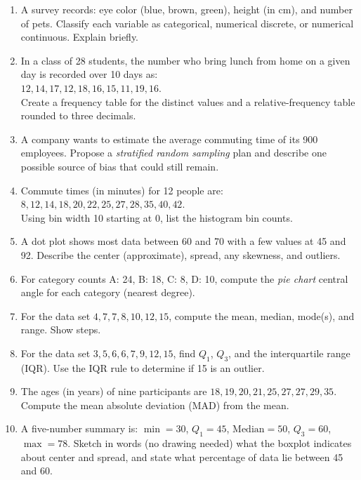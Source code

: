\documentclass[11pt]{article}
\begin{document}
\begin{enumerate}

\item A survey records: eye color (blue, brown, green), height (in cm), and number of pets. Classify each variable as categorical, numerical discrete, or numerical continuous. Explain briefly.

\item In a class of 28 students, the number who bring lunch from home on a given day is recorded over 10 days as:\\
$12, 14, 17, 12, 18, 16, 15, 11, 19, 16$.\\
Create a frequency table for the distinct values and a relative-frequency table rounded to three decimals.

\item A company wants to estimate the average commuting time of its 900 employees. Propose a \emph{stratified random sampling} plan and describe one possible source of bias that could still remain.

\item Commute times (in minutes) for 12 people are:\\
$8, 12, 14, 18, 20, 22, 25, 27, 28, 35, 40, 42$.\\
Using bin width 10 starting at 0, list the histogram bin counts.

\item A dot plot shows most data between 60 and 70 with a few values at 45 and 92. Describe the center (approximate), spread, any skewness, and outliers.

\item For category counts A: 24, B: 18, C: 8, D: 10, compute the \emph{pie chart} central angle for each category (nearest degree).

\item For the data set $4, 7, 7, 8, 10, 12, 15$, compute the mean, median, mode(s), and range. Show steps.

\item For the data set $3, 5, 6, 6, 7, 9, 12, 15$, find $Q_1$, $Q_3$, and the interquartile range (IQR). Use the IQR rule to determine if 15 is an outlier.

\item The ages (in years) of nine participants are $18, 19, 20, 21, 25, 27, 27, 29, 35$. Compute the mean absolute deviation (MAD) from the mean.

\item A five-number summary is: $\min=30$, $Q_1=45$, $\text{Median}=50$, $Q_3=60$, $\max=78$. Sketch in words (no drawing needed) what the boxplot indicates about center and spread, and state what percentage of data lie between 45 and 60.


\end{enumerate}
\end{document}
